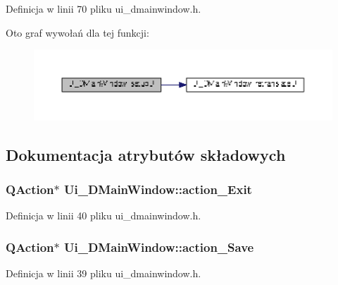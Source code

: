 Definicja w linii 70 pliku ui\+\_\+dmainwindow.\+h.



Oto graf wywołań dla tej funkcji\+:\nopagebreak
\begin{figure}[H]
\begin{center}
\leavevmode
\includegraphics[width=350pt]{class_ui___d_main_window_aa53f3a89bf520704a3e79037df2fd451_cgraph}
\end{center}
\end{figure}




\subsection{Dokumentacja atrybutów składowych}
\hypertarget{class_ui___d_main_window_a00e6b795743b676bdf3ed853e91f7029}{}
\subsubsection[{action\+\_\+\+Exit}]{\setlength{\rightskip}{0pt plus 5cm}Q\+Action$\ast$ Ui\+\_\+\+D\+Main\+Window\+::action\+\_\+\+Exit}\label{class_ui___d_main_window_a00e6b795743b676bdf3ed853e91f7029}


Definicja w linii 40 pliku ui\+\_\+dmainwindow.\+h.

\hypertarget{class_ui___d_main_window_a7ab98279e07bdd724a091ea06012c87b}{}
\subsubsection[{action\+\_\+\+Save}]{\setlength{\rightskip}{0pt plus 5cm}Q\+Action$\ast$ Ui\+\_\+\+D\+Main\+Window\+::action\+\_\+\+Save}\label{class_ui___d_main_window_a7ab98279e07bdd724a091ea06012c87b}


Definicja w linii 39 pliku ui\+\_\+dmainwindow.\+h.

